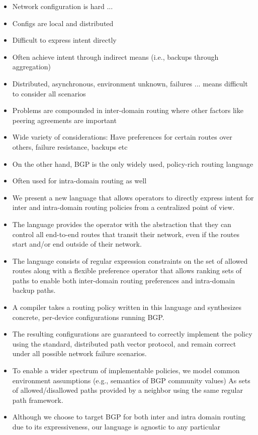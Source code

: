 \documentclass{sigplanconf}
\begin{document}
\begin{itemize}
	\item Network configuration is hard ...
	\item Configs are local and distributed
	\item Difficult to express intent directly
	\item Often achieve intent through indirect means (i.e., backups through aggregation)
	\item Distributed, asynchronous, environment unknown, failures ... means difficult to consider all scenarios	
	\item Problems are compounded in inter-domain routing where other factors like peering agreements are important
	\item Wide variety of considerations: Have preferences for certain routes over others, failure resistance, backups etc
	\item On the other hand, BGP is the only widely used, policy-rich routing language
	\item Often used for intra-domain routing as well
	\item We present a new language that allows operators to directly express intent for inter and intra-domain routing policies 
		  from a centralized point of view.
	\item The language provides the operator with the abstraction that they can control all end-to-end routes that transit their 
		  network, even if the routes start and/or end outside of their network.
	\item The language consists of regular expression constraints on the set of allowed routes along with a flexible preference operator
		  that allows ranking sets of paths to enable both inter-domain routing preferences and intra-domain backup paths.
	\item A compiler takes a routing policy written in this language and synthesizes concrete, per-device configurations running BGP. 
	\item The resulting configurations are guaranteed to correctly implement the policy using the standard, distributed path vector protocol, 
		  and remain correct under all possible network failure scenarios.
	\item To enable a wider spectrum of implementable policies, we model common environment assumptions (e.g., semantics of BGP community values)
		  As sets of allowed/disallowed paths provided by a neighbor using the same regular path framework.
	\item Although we choose to target BGP for both inter and intra domain routing due to its expressiveness, our language is agnostic to any particular 

\end{itemize}
\end{document}
